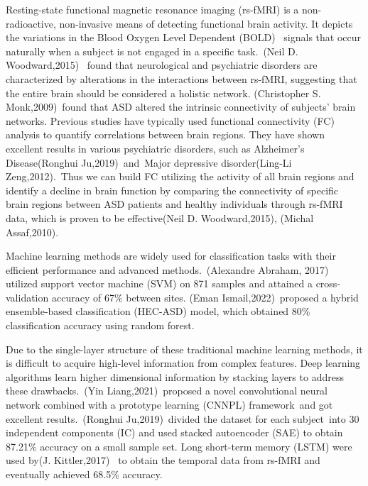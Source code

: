 \documentclass[a4paper]{cas-dc}
\begin{document}
Resting-state functional magnetic resonance imaging (rs-fMRI) is a non-radioactive, non-invasive means of detecting functional brain activity. It depicts the variations in the Blood Oxygen Level Dependent (BOLD)  signals that occur naturally when a subject is not engaged in a specific task. (Neil D. Woodward,2015)  found that neurological and psychiatric disorders are characterized by alterations in the interactions between rs-fMRI, suggesting that the entire brain should be considered a holistic network. (Christopher S. Monk,2009) found that ASD altered the intrinsic connectivity of subjects' brain networks. Previous studies have typically used functional connectivity (FC) analysis to quantify correlations between brain regions. They have shown excellent results in various psychiatric disorders, such as Alzheimer's Disease(Ronghui Ju,2019) and Major depressive disorder(Ling-Li Zeng,2012). Thus we can build FC utilizing the activity of all brain regions and identify a decline in brain function by comparing the connectivity of specific brain regions between ASD patients and healthy individuals through rs-fMRI data, which is proven to be effective(Neil D. Woodward,2015), (Michal Assaf,2010).  

Machine learning methods are widely used for classification tasks with their efficient performance and advanced methods. (Alexandre Abraham, 2017) utilized support vector machine (SVM) on 871 samples and attained a cross-validation accuracy of 67\% between sites. (Eman Ismail,2022) proposed a hybrid ensemble-based classification (HEC-ASD) model, which obtained 80\% classification accuracy using random forest. 

Due to the single-layer structure of these traditional machine learning methods, it is difficult to acquire high-level information from complex features. Deep learning algorithms learn higher dimensional information by stacking layers to address these drawbacks. (Yin Liang,2021) proposed a novel convolutional neural network combined with a prototype learning (CNNPL) framework and got excellent results. (Ronghui Ju,2019) divided the dataset for each subject into 30 independent components (IC) and used stacked autoencoder (SAE) to obtain 87.21\% accuracy on a small sample set. Long short-term memory (LSTM) were used by(J. Kittler,2017)  to obtain the temporal data from rs-fMRI and eventually achieved 68.5\% accuracy. 
\end{document}
